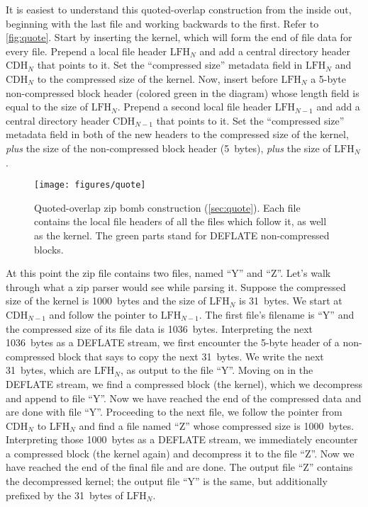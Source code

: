 \documentclass[letterpaper,twocolumn,10pt]{article}
\newcommand{\CDH}{\mathrm{CDH}}
\newcommand{\LFH}{\mathrm{LFH}}
\begin{document}
It is easiest to understand this quoted-overlap construction from the inside out,
beginning with the last file and working backwards to the first.
Refer to \autoref{fig:quote}.
Start by inserting the kernel, which will form the end of file data for every file.
Prepend a local file header $\LFH_N$
and add a central directory header $\CDH_N$ that points to it.
Set the ``compressed size'' metadata field in $\LFH_N$ and $\CDH_N$ to the compressed size of the kernel.
Now, insert before $\LFH_N$ a 5-byte non-compressed block header (colored green in the diagram)
whose length field is equal to the size of $\LFH_N$.
Prepend a second local file header $\LFH_{N-1}$
and add a central directory header $\CDH_{N-1}$ that points to it.
Set the ``compressed size'' metadata field in both of the new headers to the compressed size of the kernel,
\emph{plus} the size of the non-compressed block header (\SI{5}{bytes}),
\emph{plus} the size of $\LFH_N$.

\begin{figure*}
\texttt{[image: figures/quote]}
\caption{
Quoted-overlap zip bomb construction
(\autoref{sec:quote}).
Each file contains the local file headers of all the files which follow it,
as well as the kernel.
The green parts stand for DEFLATE non-compressed blocks.
}
\label{fig:quote}
\end{figure*}

At this point the zip file contains two files, named ``Y'' and ``Z''.
Let's walk through what a zip parser would see while parsing it.
Suppose the compressed size of the kernel is \SI{1000}{bytes}
and the size of $\LFH_N$ is \SI{31}{bytes}.
We start at $\CDH_{N-1}$
and follow the pointer to $\LFH_{N-1}$.
The first file's filename is ``Y'' and
the compressed size of its file data is \SI{1036}{bytes}.
Interpreting the next \SI{1036}{bytes} as a DEFLATE stream,
we first encounter the 5-byte header of a non-compressed block
that says to copy the next \SI{31}{bytes}.
We write the next \SI{31}{bytes},
which are $\LFH_N$,
as output to the file ``Y''.
Moving on in the DEFLATE stream, we find a compressed block (the kernel),
which we decompress and append to file ``Y''.
Now we have reached the end of the compressed data and are done with file ``Y''.
Proceeding to the next file, we follow the pointer from $\CDH_N$
to $\LFH_N$ and find a file named ``Z''
whose compressed size is \SI{1000}{bytes}.
Interpreting those \SI{1000}{bytes} as a DEFLATE stream,
we immediately encounter a compressed block (the kernel again)
and decompress it to the file ``Z''.
Now we have reached the end of the final file and are done.
The output file ``Z'' contains the decompressed kernel;
the output file ``Y'' is the same, but additionally prefixed by
the \SI{31}{bytes} of
$\LFH_N$.
\end{document}
